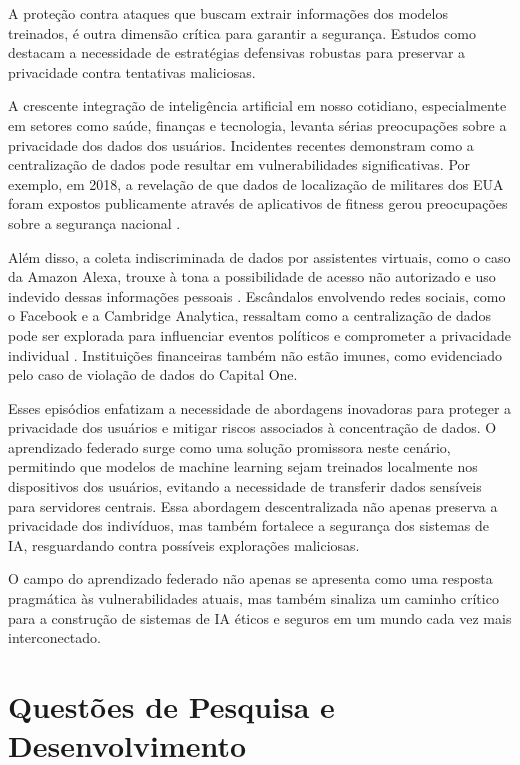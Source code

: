 A proteção contra ataques que buscam extrair informações dos modelos treinados, é outra dimensão crítica para garantir a segurança. Estudos como \cite{hitaj2017deep} destacam a necessidade de estratégias defensivas robustas para preservar a privacidade contra tentativas maliciosas.

A crescente integração de inteligência artificial em nosso cotidiano, especialmente em setores como saúde, finanças e tecnologia, levanta sérias preocupações sobre a privacidade dos dados dos usuários. Incidentes recentes demonstram como a centralização de dados pode resultar em vulnerabilidades significativas. Por exemplo, em 2018, a revelação de que dados de localização de militares dos EUA foram expostos publicamente através de aplicativos de fitness gerou preocupações sobre a segurança nacional \cite{bbc2018strava}. 

Além disso, a coleta indiscriminada de dados por assistentes virtuais, como o caso da Amazon Alexa, trouxe à tona a possibilidade de acesso não autorizado e uso indevido dessas informações pessoais \cite{bloomberg2019amazon}. Escândalos envolvendo redes sociais, como o Facebook e a Cambridge Analytica, ressaltam como a centralização de dados pode ser explorada para influenciar eventos políticos e comprometer a privacidade individual \cite{guardian2018cambridge}. Instituições financeiras também não estão imunes, como evidenciado pelo caso de violação de dados do Capital One\cite{capitalone2019databreach}. 

Esses episódios enfatizam a necessidade de abordagens inovadoras para proteger a privacidade dos usuários e mitigar riscos associados à concentração de dados. O aprendizado federado surge como uma solução promissora neste cenário, permitindo que modelos de machine learning sejam treinados localmente nos dispositivos dos usuários, evitando a necessidade de transferir dados sensíveis para servidores centrais. Essa abordagem descentralizada não apenas preserva a privacidade dos indivíduos, mas também fortalece a segurança dos sistemas de IA, resguardando contra possíveis explorações maliciosas. 

O campo do aprendizado federado não apenas se apresenta como uma resposta pragmática às vulnerabilidades atuais, mas também sinaliza um caminho crítico para a construção de sistemas de IA éticos e seguros em um mundo cada vez mais interconectado.

\section{Questões de Pesquisa e Desenvolvimento}
\label{sec:questoes}

